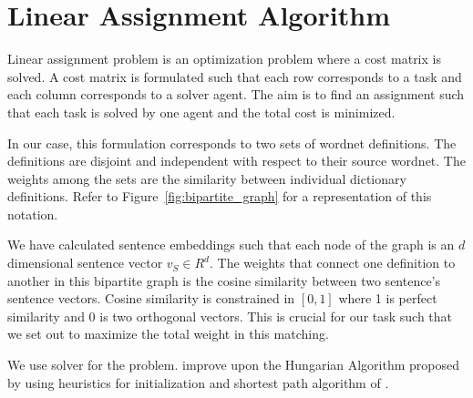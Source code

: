 %
\section{Linear Assignment Algorithm}%
\label{sec:linear_assignment_algorithm}

Linear assignment problem is an optimization problem where a cost matrix is solved.
A cost matrix is formulated such that each row corresponds to a task and each column corresponds to a solver agent.
The aim is to find an assignment such that each task is solved by one agent and the total cost is minimized.

In our case, this formulation corresponds to two sets of wordnet definitions.
The definitions are disjoint and independent with respect to their source wordnet.
The weights among the sets are the similarity between individual dictionary definitions.
Refer to Figure~\ref{fig:bipartite_graph} for a representation of this notation.

We have calculated sentence embeddings such that each node of the graph is an $d$ dimensional sentence vector $v_S \in R^{d}$.
The weights that connect one definition to another in this bipartite graph is the cosine similarity between two sentence's sentence vectors.
Cosine similarity is constrained in $[0,1]$ where 1 is perfect similarity and 0 is two orthogonal vectors.
This is crucial for our task such that we set out to maximize the total weight in this matching.


We use \textcite{jonker_shortest_1987} solver for the problem.
\citeauthor{jonker_shortest_1987} improve upon the Hungarian Algorithm proposed by \textcite{kuhn_hungarian_1955} using heuristics for initialization and shortest path algorithm of \textcite{dijkstra_note_1959}.
